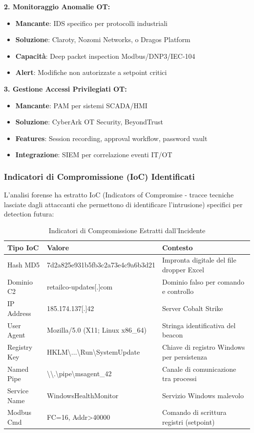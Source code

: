 \textbf{2. Monitoraggio Anomalie OT:}
\begin{itemize}
    \item \textbf{Mancante}: IDS specifico per protocolli industriali
    \item \textbf{Soluzione}: Claroty, Nozomi Networks, o Dragos Platform
    \item \textbf{Capacità}: Deep packet inspection Modbus/DNP3/IEC-104
    \item \textbf{Alert}: Modifiche non autorizzate a setpoint critici
\end{itemize}

\textbf{3. Gestione Accessi Privilegiati OT:}
\begin{itemize}
    \item \textbf{Mancante}: PAM per sistemi SCADA/HMI
    \item \textbf{Soluzione}: CyberArk OT Security, BeyondTrust
    \item \textbf{Features}: Session recording, approval workflow, password vault
    \item \textbf{Integrazione}: SIEM per correlazione eventi IT/OT
\end{itemize}

\subsubsection{Indicatori di Compromissione (IoC) Identificati}

L'analisi forense ha estratto IoC (Indicators of Compromise - tracce tecniche lasciate dagli attaccanti che permettono di identificare l'intrusione) specifici per detection futura:

\begin{table}[htbp]
\centering
\caption{Indicatori di Compromissione Estratti dall'Incidente}
\label{tab:ioc_retailco}
\begin{tabular}{|l|l|p{5cm}|}
\hline
\textbf{Tipo IoC} & \textbf{Valore} & \textbf{Contesto} \\
\hline
Hash MD5 & 7d2a825e931b5fb3c2a73e4c9a6b3d21 & Impronta digitale del file dropper Excel \\
Dominio C2 & retailco-updates[.]com & Dominio falso per comando e controllo \\
IP Address & 185.174.137[.]42 & Server Cobalt Strike \\
User Agent & Mozilla/5.0 (X11; Linux x86\_64) & Stringa identificativa del beacon \\
Registry Key & HKLM\textbackslash{}...\textbackslash{}Run\textbackslash{}SystemUpdate & Chiave di registro Windows per persistenza \\
Named Pipe & \textbackslash{}\textbackslash{}.\textbackslash{}pipe\textbackslash{}msagent\_42 & Canale di comunicazione tra processi \\
Service Name & WindowsHealthMonitor & Servizio Windows malevolo \\
Modbus Cmd & FC=16, Addr>40000 & Comando di scrittura registri (setpoint) \\
\hline
\end{tabular}
\end{table}

